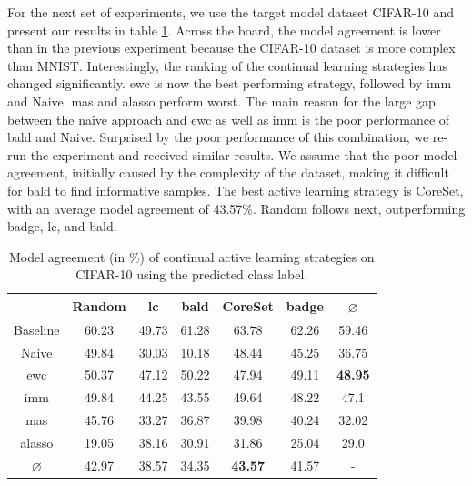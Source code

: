 For the next set of experiments, we use the target model dataset CIFAR-10 and present our results in table \ref{fig:ModelStealingCIFAR10Label}. 
Across the board, the model agreement is lower than in the previous experiment because the CIFAR-10 dataset is more complex than MNIST. Interestingly, the ranking of
the continual learning strategies has changed significantly. \gls{ewc} is now the best performing strategy, followed by \gls{imm} and Naive. \gls{mas} and \gls{alasso}
perform worst. The main reason for the large gap between the naive approach and \gls{ewc} as well as \gls{imm} is the poor performance of \gls{bald} and Naive.
Surprised by the poor performance of this combination, we re-run the experiment and received similar results. We assume that the poor model agreement, initially
caused by the complexity of the dataset, making it difficult for \gls{bald} to find informative samples. The best active learning strategy is CoreSet, with an average
model agreement of 43.57\%. Random follows next, outperforming \gls{badge}, \gls{lc}, and \gls{bald}. \par

\begin{table}[h]
    \centering
    \begin{tabular}{ c | c c c c c | c } 
         & Random & \gls{lc} & \gls{bald} & CoreSet & \gls{badge} & $\varnothing$\\ 
        \hline
        Baseline & 60.23 & 49.73 & 61.28 & 63.78 & 62.26 & 59.46\\
        \hline
        Naive & 49.84 & 30.03 & 10.18 & 48.44 & 45.25 & 36.75\\
        \gls{ewc} & 50.37 & 47.12 & 50.22 & 47.94 & 49.11 & \textbf{48.95} \\
        \gls{imm} & 49.84 & 44.25 & 43.55 & 49.64 & 48.22 & 47.1\\
        \gls{mas} & 45.76 & 33.27 & 36.87 & 39.98 & 40.24 & 32.02\\
        \gls{alasso} & 19.05 & 38.16 & 30.91 & 31.86 & 25.04 & 29.0\\
        \hline
        $\varnothing$ & 42.97 & 38.57 & 34.35 & \textbf{43.57} & 41.57 & -\\
    \end{tabular}
    \caption{Model agreement (in \%) of continual active learning strategies on CIFAR-10 using the predicted class label.}
    \label{fig:ModelStealingCIFAR10Label}
\end{table}


